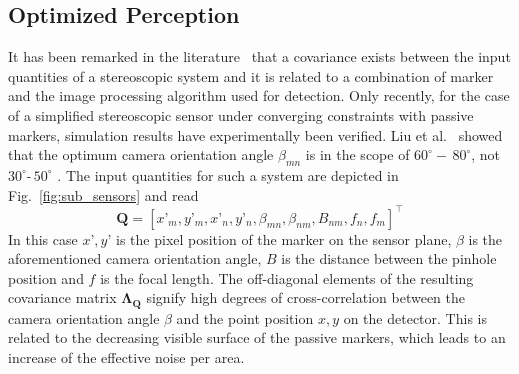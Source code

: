 \documentclass[5p,times,procedia]{elsarticle}
\begin{document}
\subsection{Optimized Perception}
It has been remarked in the literature~\cite{Di_Leo_2011} that a covariance exists between the input quantities of a stereoscopic system and it is related to a combination of marker and the image processing algorithm used for detection.
Only recently, for the case of a simplified stereoscopic sensor under converging constraints with passive markers, simulation results have experimentally been verified.
Liu et al.~\cite{Liu_2021} showed that the optimum camera orientation angle $\beta_{mn}$ is in the scope of $60^{\circ} -\, 80^{\circ}$, not $30^{\circ} \text{-}\, 50^{\circ}$ \cite{Yang2018,Fooladgar2013,Sankowski2017}. The input quantities for such a system are depicted in Fig.~\ref{fig:sub_sensors} and read
\begin{equation*}
	\mathbf{Q}= \left[x’_m, y’_m, x’_n, y’_n, \beta_{mn}, \beta_{nm}, B_{nm}, f_{n},f_{m}\right]^{\top}
\end{equation*}
In this case $x’, y’$ is the pixel position of the marker on the sensor plane, $\beta$ is the aforementioned camera orientation angle, $B$ is the distance between the pinhole position and $f$ is the focal length. 
The off-diagonal elements of the resulting covariance matrix $\mathbf{\Lambda_{Q}}$ signify high degrees of cross-correlation between the camera orientation angle $\beta$ and the point position $x,y$ on the detector. This is related to the decreasing visible surface of the passive markers, which leads to an increase of the effective noise per area.
\end{document}
